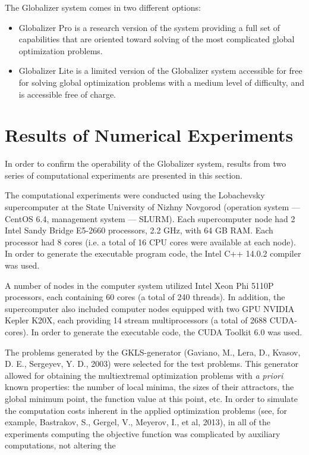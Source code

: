 \documentclass{gOMS2e}
\theoremstyle{plain}%
\theoremstyle{definition}
\theoremstyle{remark}
\begin{document}
\par
The Globalizer system comes in two different options:
\begin{itemize}
  \item Globalizer Pro is a research version of the system providing a full set of
  capabilities that are oriented toward solving of the most complicated global optimization problems.
  \item Globalizer Lite is a limited version of the Globalizer system accessible for free for
  solving global optimization problems with a medium level of difficulty, and is accessible free of charge.
\end{itemize}
\section{Results of Numerical Experiments}
\label{sec:experiments}
In order to confirm the operability of the Globalizer system, results from two
series of computational experiments are presented in this section.
\par
The computational experiments were conducted using the Lobachevsky supercomputer at the
State University of Nizhny Novgorod (operation system --- CentOS 6.4, management system --- SLURM).
Each supercomputer node had 2 Intel Sandy Bridge E5-2660 processors, 2.2 GHz, with 64 GB RAM.
Each processor had 8 cores (i.e. a total of 16 CPU cores were available at each node).
In order to generate the executable program code, the Intel C++ 14.0.2 compiler was used.
\par
A number of nodes in the computer system utilized Intel Xeon Phi 5110P processors,
each containing 60 cores (a total of 240 threads). In addition, the supercomputer also
included computer nodes equipped with two GPU NVIDIA Kepler K20X, each providing 14
stream multiprocessors (a total of 2688 CUDA-cores). In order to generate the executable
code, the CUDA Toolkit 6.0 was used.
\par
The problems generated by the GKLS-generator (Gaviano, M., Lera, D., Kvasov, D. E., Sergeyev, Y. D., 2003)
were selected for the test problems. This generator allowed for obtaining the multiextremal
optimization problems with \textit{a priori} known properties: the number of local minima,
the sizes of their attractors, the global minimum point, the function value at this point, etc.
In order to simulate the computation costs inherent in the applied optimization problems
(see, for example, Bastrakov, S., Gergel, V., Meyerov, I., et al, 2013), in all of the experiments
computing the objective function was complicated by auxiliary computations, not altering the
\end{document}
